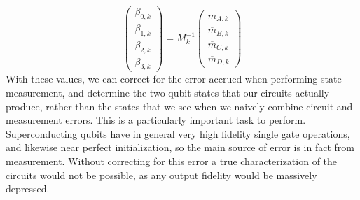 \begin{equation}
\begin{pmatrix} \beta_{0,k} \\ \beta_{1,k} \\ \beta_{2,k} \\ \beta_{3,k}
\end{pmatrix}=M_k^{-1}
\begin{pmatrix} \overline{m}_{A,k} \\ \overline{m}_{B,k} \\ \overline{m}_{C,k}
\\ \overline{m}_{D,k}
\end{pmatrix}
\end{equation}
With these values, we can correct for the error accrued when performing state
measurement, and determine the two-qubit states that our circuits actually
produce, rather than the states that we see when we naively combine circuit and
measurement errors. This is a particularly important task to perform.
Superconducting qubits have in general very high fidelity single gate operations,
and likewise near perfect initialization, so the main source of error is in fact
from measurement. Without correcting for this error a true characterization of
the circuits would not be possible, as any output fidelity would be massively
depressed.

